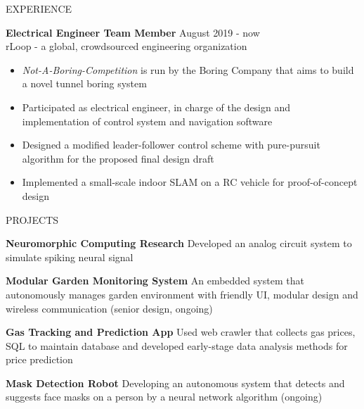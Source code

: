 \documentclass{resume} %
\begin{document}
\begin{rSection}{EXPERIENCE}
		
		\textbf{Electrical Engineer Team Member} \hfill August 2019 - now
		\\	rLoop - a global, crowdsourced engineering organization \hfill \textit{}
		\begin{itemize}
			\itemsep -4pt {} 
			\item \textit{Not-A-Boring-Competition} is run by the Boring Company that aims to build a novel tunnel boring system
			\item Participated as electrical engineer, in charge of the design and implementation of control system and navigation software
			\item Designed a modified leader-follower control scheme with pure-pursuit algorithm for the proposed final design draft
			\item Implemented a small-scale indoor SLAM on a RC vehicle for proof-of-concept design
		\end{itemize}
		
			
		
	\end{rSection} 
	
	
	\begin{rSection}{PROJECTS}
		\vspace{-1em}
		
		\item \textbf{Neuromorphic Computing Research} {Developed an analog circuit system to simulate spiking neural signal}
		
		\item \textbf{Modular Garden Monitoring System} {An embedded system that autonomously manages garden environment with friendly UI, modular design and wireless communication (senior design, ongoing)}
		
		\item \textbf{Gas Tracking and Prediction App} {Used web crawler that collects gas prices, SQL to maintain database and developed early-stage data analysis methods for price prediction}
		
		\item \textbf{Mask Detection Robot} {Developing an autonomous system that detects and suggests face masks on a person by a neural network algorithm (ongoing)}
		
		
	\end{rSection} 
	
\end{document}
